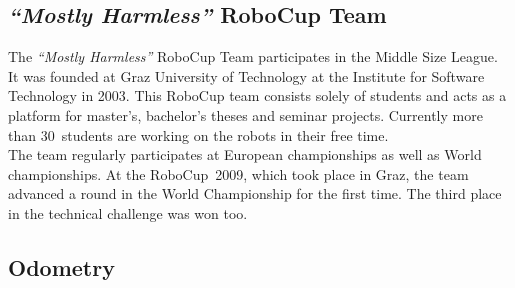 \documentclass[12pt,a4paper]{article}
\newcommand{\MH}{\emph{``Mostly Harmless''} RoboCup Team\xspace}
\newcommand{\MSL}{Middle Size League\xspace}
\begin{document}

\subsection{\MH}

The \MH participates in the \MSL. 
It was founded at Graz University of Technology at the Institute for Software Technology in 2003. 
This RoboCup team consists solely of students and acts as a platform for master's, bachelor's theses and seminar projects.
Currently more than 30~students are working on the robots in their free time.\\
The team regularly participates at European championships as well as World championships.
At the RoboCup~2009, which took place in Graz, the team advanced a round in the World Championship for the first time.
The third place in the technical challenge was won too.



\subsection{Odometry}

\end{document}

